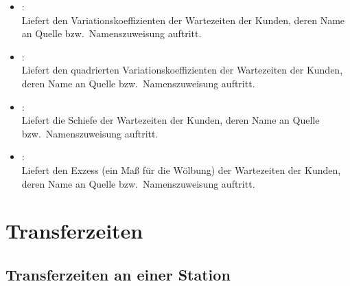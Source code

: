 \begin{itemize}
\item
{}:\\
Liefert den Variationskoeffizienten der Wartezeiten der Kunden, deren Name an Quelle bzw.\ Namenszuweisung  auftritt.

\item
{}:\\
Liefert den quadrierten Variationskoeffizienten der Wartezeiten der Kunden, deren Name an Quelle bzw.\ Namenszuweisung  auftritt.

\item
{}:\\
Liefert die Schiefe der Wartezeiten der Kunden, deren Name an Quelle bzw.\ Namenszuweisung  auftritt.

\item
{}:\\
Liefert den Exzess (ein Maß für die Wölbung) der Wartezeiten der Kunden, deren Name an Quelle bzw.\ Namenszuweisung  auftritt.

\end{itemize}



\section{Transferzeiten}



\subsection{Transferzeiten an einer Station}

